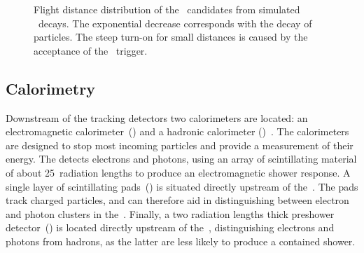 \begin{figure}[htb] \centerfloat
    \caption{
        Flight distance distribution of the \Bs~candidates from simulated \BsDsPi~decays.
        The exponential decrease corresponds with the decay of particles. The steep turn-on for small distances is caused by the acceptance of the \lhcb~trigger.}
    \label{fig:detector_FD}
\end{figure}

\subsection{Calorimetry}
\label{sec:calorimetry}

Downstream of the tracking detectors two calorimeters are located: an electromagnetic calorimeter~(\ecal) and a hadronic calorimeter (\hcal)~\cite{Perret:2015pla}.
The calorimeters are designed to stop most incoming particles and provide a measurement of their energy.
The \ecal detects electrons and photons, using an array of scintillating material of about \num{25}~radiation lengths to produce an electromagnetic shower response.
A single layer of scintillating pads~(\spd) is situated directly upstream of the~\ecal.
The pads track charged particles, and can therefore aid in distinguishing between electron and photon clusters in the~\ecal.
Finally, a two radiation lengths thick preshower detector~(\presh) is located directly upstream of the~\ecal, distinguishing electrons and photons from hadrons, as the latter are less likely to produce a contained shower.

